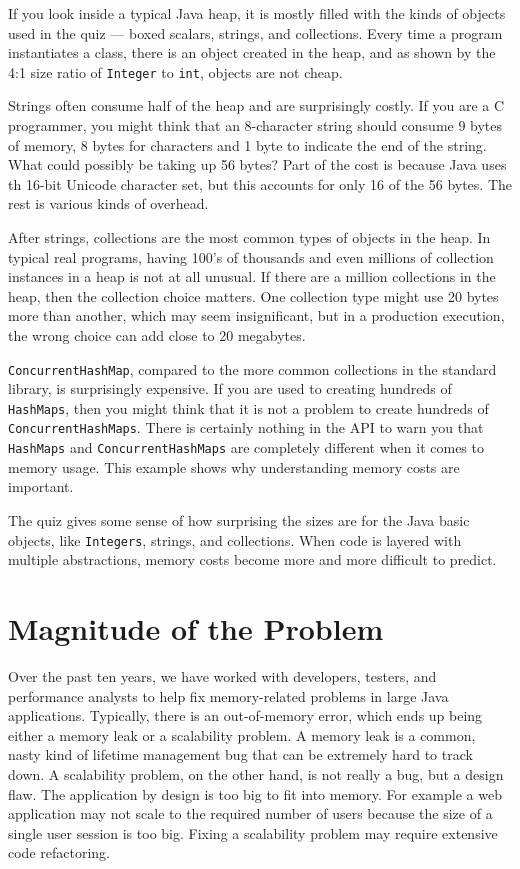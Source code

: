 If you look inside a typical Java heap, it is mostly filled with the kinds of objects used in the quiz --- boxed scalars, strings, and collections. Every time a program instantiates a class, there is an object created in the heap, and as shown by the 4:1 size ratio of \texttt{Integer} to \texttt{int}, objects are not cheap. 

Strings often consume half of the heap and are surprisingly costly. If you are a C programmer, you might think that an 8-character string should consume 9 bytes of memory, 8 bytes for characters and 1 byte to indicate the end of the string. What could possibly be taking up 56 bytes? Part of the cost is because Java uses th 16-bit Unicode character set, but this accounts for only 16 of the 56 bytes. The rest is various kinds of overhead.

After strings, collections are the most common types of objects in the heap. In typical real programs, having 100's of thousands and even millions of collection instances in a heap is not at all unusual. If there are a million collections in the heap, then the collection choice matters. One collection type might use 20 bytes more than another, which may seem insignificant, but in a production execution, the wrong choice can add close to 20 megabytes.

\texttt{ConcurrentHashMap}, compared to the more common collections in the standard library, is surprisingly expensive. If you are used to creating hundreds of \texttt{HashMaps}, then you might think that it is not a problem to create hundreds of \texttt{ConcurrentHashMaps}. There is certainly nothing in the API to warn you that \texttt{HashMaps} and \texttt{ConcurrentHashMaps} are completely different when it comes to memory usage. This example shows why understanding memory costs are important.

The quiz gives some sense of how surprising the sizes are for the Java basic objects, like \texttt{Integers}, strings, and collections. When code is layered with multiple abstractions, memory costs become more and more difficult to predict.


\section{Magnitude of the Problem}

Over the past ten years, we have worked with developers, testers, and performance analysts to help fix memory-related problems in large Java applications. Typically, there is an out-of-memory error, which ends up being either a memory leak or a scalability problem. A memory leak is a common, nasty kind of lifetime management bug that can be extremely hard to track down. A scalability problem, on the other hand, is not really a bug, but a design flaw. The application by design is too big to fit into memory. For example a web application may not scale to the required number of users because the size of a single user session is too big. Fixing a scalability problem may require extensive code refactoring.
  
